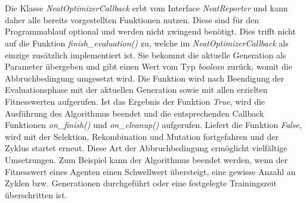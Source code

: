 \\\\
Die Klasse \emph{NeatOptimizerCallback} erbt vom Interface \emph{NeatReporter} und kann daher alle bereits vorgestellten Funktionen nutzen. Diese sind für den Programmablauf optional und werden nicht zwingend benötigt. Dies trifft nicht auf die Funktion \emph{finish\_evaluation()} zu, welche im \emph{NeatOptimizerCallback} als einzige zusätzlich implementiert ist. Sie bekommt die aktuelle Generation als Parameter übergeben und gibt einen Wert vom Typ \emph{boolean} zurück, womit die Abbruchbedingung umgesetzt wird. Die Funktion wird nach Beendigung der Evaluationsphase mit der aktuellen Generation sowie mit allen erzielten Fitnesswerten aufgerufen. Ist das Ergebnis der Funktion \emph{True}, wird die Ausführung des Algorithmus beendet und die entsprechenden Callback Funktionen \emph{on\_finish()} und \emph{on\_cleanup()} aufgerufen. Liefert die Funktion \emph{False}, wird mit der Selektion, Rekombination und Mutation fortgefahren und der Zyklus startet erneut. Diese Art der Abbruchbedingung ermöglicht vielfältige Umsetzungen. Zum Beispiel kann der Algorithmus beendet werden, wenn der Fitnesswert eines Agenten einen Schwellwert übersteigt, eine gewisse Anzahl an Zyklen bzw. Generationen durchgeführt oder eine festgelegte Trainingszeit überschritten ist.

